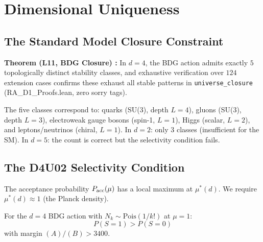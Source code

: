 \documentclass[12pt,a4paper]{article}
\begin{document}
\section{Dimensional Uniqueness}\label{sec:uniqueness}

\subsection{The Standard Model Closure Constraint}

\begin{leanbox}
\textbf{Theorem (L11, BDG Closure) \statusLV:} In $d=4$, the BDG action admits exactly $5$ topologically distinct stability classes, and exhaustive verification over $124$ extension cases confirms these exhaust all stable patterns in \texttt{universe\_closure} (RA\_D1\_Proofs.lean, zero sorry tags).
\end{leanbox}

The five classes correspond to: quarks (SU(3), depth $L=4$), gluons (SU(3), depth $L=3$), electroweak gauge bosons (spin-1, $L=1$), Higgs (scalar, $L=2$), and leptons/neutrinos (chiral, $L=1$).  In $d=2$: only 3 classes (insufficient for the SM).  In $d=5$: the count is correct but the selectivity condition fails.

\subsection{The D4U02 Selectivity Condition}

The acceptance probability $P_{\mathrm{acc}}(\mu)$ has a local maximum at $\mu^*(d)$.  We require $\mu^*(d) \approx 1$ (the Planck density).

\begin{theorem}\label{thm:d4u02}
For the $d=4$ BDG action with $N_k \sim \mathrm{Pois}(1/k!)$ at $\mu=1$:
\begin{equation}
  P(S=1) > P(S=0)
  \label{eq:d4u02}
\end{equation}
with margin $(A)/(B) > 3400$.
\end{theorem}
\end{document}
